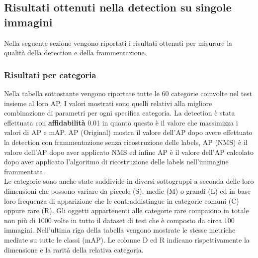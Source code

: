 \subsection{Risultati ottenuti nella detection su singole immagini}
Nella seguente sezione vengono riportati i risultati ottenuti per misurare la qualità della detection e della frammentazione.
\subsubsection{Risultati per categoria}
Nella tabella sottostante vengono riportate tutte le 60 categorie coinvolte nel test insieme al loro AP. I valori mostrati sono quelli relativi alla migliore combinazione di parametri per ogni specifica categoria. La detection è stata effettuata con \textbf{affidabilità} 0.01 in quanto questo è il valore che massimizza i valori di AP e mAP. AP (Original) mostra il valore dell'AP dopo avere effettuato la detection con frammentazione senza ricostruzione delle labels, AP (NMS) è il valore dell'AP dopo aver applicato NMS ed infine AP è il valore dell'AP calcolato dopo aver applicato l'algoritmo di ricostruzione delle labels nell'immagine frammentata.\\
Le categorie sono anche state suddivide in diversi sottogruppi a seconda delle loro dimensioni che possono variare da piccole (S), medie (M) o grandi (L) ed in base loro frequenza di apparizione che le contraddistingue in categorie comuni (C) oppure rare (R). Gli oggetti appartenenti alle categorie rare compaiono in totale non più di 1000 volte in tutto il dataset di test che è composto da circa 100 immagini. Nell'ultima riga della tabella vengono mostrate le stesse metriche mediate su tutte le classi (mAP). Le colonne D ed R indicano rispettivamente la dimensione e la rarità della relativa categoria.

